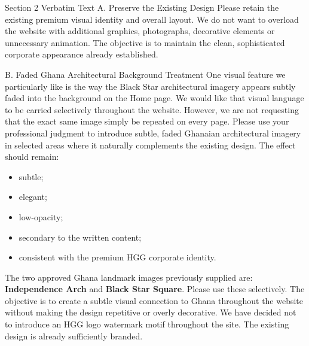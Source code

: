 \documentclass[11pt,a4paper]{article}
\begin{document}
\begin{VerbatimClientBox}{Section 2 Verbatim Text}
A. Preserve the Existing Design
Please retain the existing premium visual identity and overall layout.
We do not want to overload the website with additional graphics, photographs, decorative elements or unnecessary animation.
The objective is to maintain the clean, sophisticated corporate appearance already established.

B. Faded Ghana Architectural Background Treatment
One visual feature we particularly like is the way the Black Star architectural imagery appears subtly faded into the background on the Home page.
We would like that visual language to be carried selectively throughout the website.
However, we are not requesting that the exact same image simply be repeated on every page.
Please use your professional judgment to introduce subtle, faded Ghanaian architectural imagery in selected areas where it naturally complements the existing design.
The effect should remain:
\begin{itemize}[noitemsep]
    \item subtle;
    \item elegant;
    \item low-opacity;
    \item secondary to the written content;
    \item consistent with the premium HGG corporate identity.
\end{itemize}
The two approved Ghana landmark images previously supplied are:
\textbf{Independence Arch} and \textbf{Black Star Square}.
Please use these selectively.
The objective is to create a subtle visual connection to Ghana throughout the website without making the design repetitive or overly decorative.
We have decided not to introduce an HGG logo watermark motif throughout the site. The existing design is already sufficiently branded.
\end{VerbatimClientBox}
\end{document}
